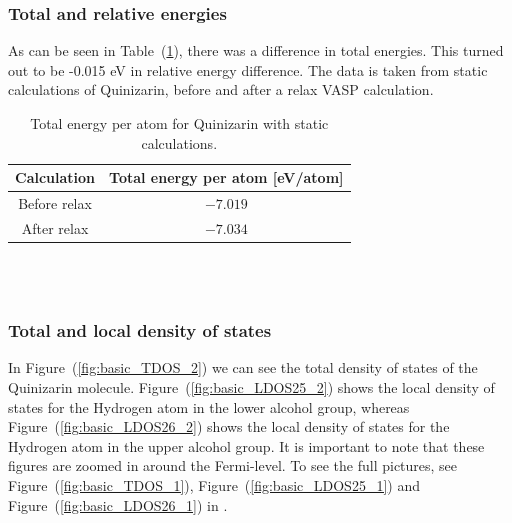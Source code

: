 \documentclass{article}
\begin{document}
      \vspace{1cm}

    \subsubsection{Total and relative energies}

      As can be seen in Table~(\ref{tab:TOTENquinizarin}), there was a difference in total energies. This turned out to be -0.015 eV in relative energy difference. The data is taken from static calculations of Quinizarin, before and after a relax VASP calculation. \\

      \begin{table}[H]
        \centering
        \caption{Total energy per atom for Quinizarin with static calculations. }
        \label{tab:TOTENquinizarin}
        \begin{tabular}{|c|c|}
            \hline
            Calculation & Total energy per atom [eV/atom]  \\
            \hline \hline
            Before relax & $-7.019$ \\
            After relax & $-7.034$ \\
            \hline
        \end{tabular} \\
        \hspace{0pt}\\
    \end{table}

      \vspace{1cm}

    \subsubsection{Total and local density of states}

      In Figure~(\ref{fig:basic_TDOS_2}) we can see the total density of states of the Quinizarin molecule. Figure~(\ref{fig:basic_LDOS25_2}) shows the local density of states for the Hydrogen atom in the lower alcohol group, whereas Figure~(\ref{fig:basic_LDOS26_2}) shows the local density of states for the Hydrogen atom in the upper alcohol group. It is important to note that these figures are zoomed in around the Fermi-level.
      To see the full pictures, see Figure~(\ref{fig:basic_TDOS_1}), Figure~(\ref{fig:basic_LDOS25_1}) and Figure~(\ref{fig:basic_LDOS26_1}) in . \\
\end{document}
